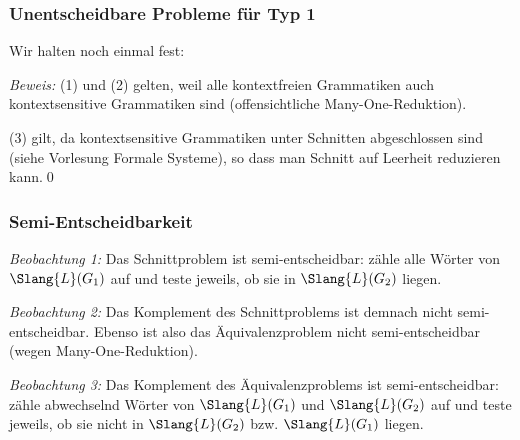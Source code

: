 \documentclass[aspectratio=1610,onlymath]{beamer}
\begin{document}
\begin{frame}\frametitle{Unentscheidbare Probleme für Typ 1}

Wir halten noch einmal fest:


\emph{Beweis:} (1) und (2) gelten, weil alle kontextfreien Grammatiken auch
kontextsensitive Grammatiken sind (offensichtliche Many-One-Reduktion).
\bigskip

(3) gilt, da kontextsensitive Grammatiken unter Schnitten abgeschlossen sind (siehe
Vorlesung Formale Systeme), so dass man Schnitt auf Leerheit reduzieren kann.\qed

\end{frame}

\begin{frame}\frametitle{Semi-Entscheidbarkeit}

\emph{Beobachtung 1:} Das Schnittproblem ist semi-entscheidbar: zähle alle
Wörter von $\Slang{L}(G_1)$ auf und teste jeweils, ob sie in $\Slang{L}(G_2)$
liegen.
\bigskip\pause

\emph{Beobachtung 2:} Das Komplement des Schnittproblems ist demnach nicht semi-entscheidbar.
Ebenso ist also das Äquivalenzproblem nicht semi-entscheidbar (wegen Many-One-Reduktion).
\bigskip\pause

\emph{Beobachtung 3:} Das Komplement des Äquivalenzproblems ist semi-entscheidbar: zähle abwechselnd Wörter von $\Slang{L}(G_1)$ und $\Slang{L}(G_2)$ auf und teste jeweils, ob sie nicht in $\Slang{L}(G_2)$ bzw. $\Slang{L}(G_1)$ liegen.

\end{frame}

\end{document}
